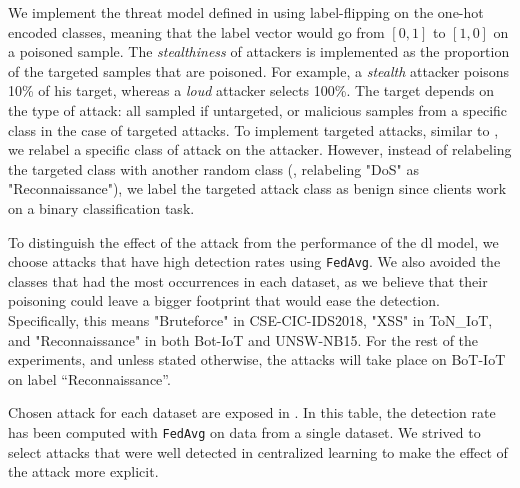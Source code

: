 We implement the threat model defined in  using label-flipping on the one-hot encoded classes, meaning that the label vector would go from $[0,1]$ to $[1,0]$ on a poisoned sample.
The \emph{stealthiness} of attackers is implemented as the proportion of the targeted samples that are poisoned.
For example, a \emph{stealth} attacker poisons 10\% of his target, whereas a \emph{loud} attacker selects 100\%.
The target depends on the type of attack: all sampled if untargeted, or malicious samples from a specific class in the case of targeted attacks.
To implement targeted attacks, similar to \citet{ma_shieldfl_2022}, we relabel a specific class of attack on the attacker.  
However, instead of relabeling the targeted class with another random class (\eg, relabeling "DoS" as "Reconnaissance"), we label the targeted attack class as benign since clients work on a binary classification task.

To distinguish the effect of the attack from the performance of the \gls{dl} model, we choose attacks that have high detection rates using \texttt{FedAvg}.
We also avoided the classes that had the most occurrences in each dataset, as we believe that their poisoning could leave a bigger footprint that would ease the detection. 
Specifically, this means "Bruteforce" in CSE-CIC-IDS2018, "XSS" in ToN\_IoT, and "Reconnaissance" in both Bot-IoT and UNSW-NB15.
For the rest of the experiments, and unless stated otherwise, the attacks will take place on BoT-IoT on label ``Reconnaissance''. 

Chosen attack for each dataset are exposed in . 
In this table, the detection rate has been computed with \texttt{FedAvg} on data from a single dataset.  
We strived to select attacks that were well detected in centralized learning to make the effect of the attack more explicit. 

